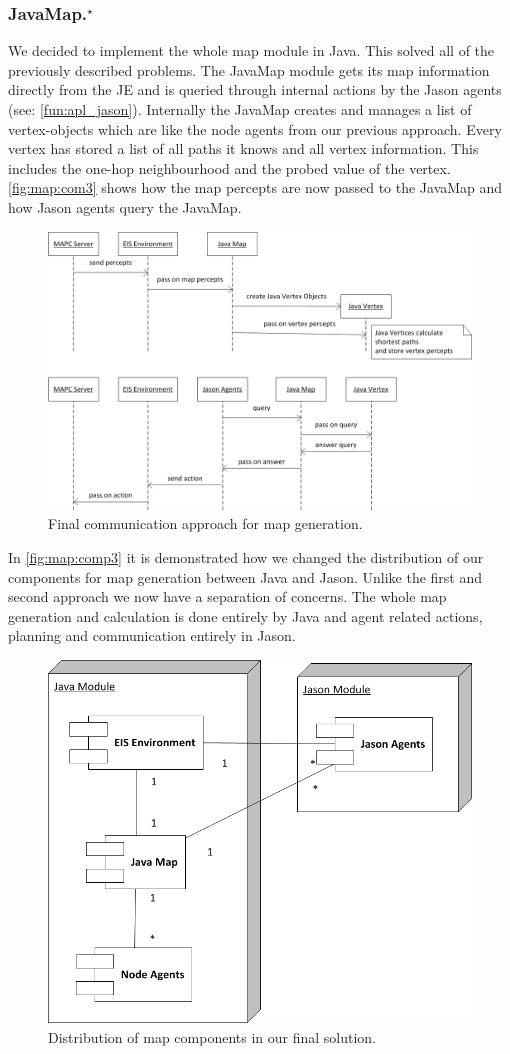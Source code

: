 \subsubsection[JavaMap]{JavaMap.$^\star$}\label{alg:map_javamap}
We decided to implement the whole map module in Java.
This solved all of the previously described problems.
The JavaMap module gets its map information directly from the JE and is queried through internal actions by the Jason agents (see: \autoref{fun:apl_jason}).
Internally the JavaMap creates and manages a list of vertex-objects which are like the node agents from our previous approach.
Every vertex has stored a list of all paths it knows and all vertex information.
This includes the one-hop neighbourhood and the probed value of the vertex.
\autoref{fig:map:com3} shows how the map percepts are now passed to the JavaMap and how Jason agents query the JavaMap.
\begin{figure}
  \centering
  \includegraphics[width=\linewidth]{images/map_com_3.png}
  \caption{Final communication approach for map generation.}
  \label{fig:map:com3}
\end{figure}

In \autoref{fig:map:comp3} it is demonstrated how we changed the distribution of our components for map generation between Java and Jason. Unlike the first and second approach we now have a separation of concerns. The whole map generation and calculation is done entirely by Java and agent related actions, planning and communication entirely in Jason.
\begin{figure}
  \centering
  \includegraphics[width=0.6\linewidth]{images/map_comp_3.png}
  \caption{Distribution of map components in our final solution.}
  \label{fig:map:comp3}
\end{figure}

